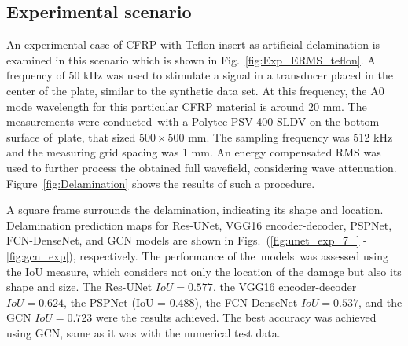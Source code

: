 \subsection{Experimental scenario}
An experimental case of CFRP with Teflon insert as artificial delamination is examined in this scenario which is shown in Fig.~\ref{fig:Exp_ERMS_teflon}. 
A frequency of \(50\) kHz was used to stimulate a signal in a transducer placed in the center of the plate, similar to the synthetic data set.
At this frequency, the A0 mode wavelength for this particular CFRP material is around \(20\) mm.
The measurements were conducted with a Polytec PSV-400 SLDV on the bottom surface of plate, that sized \(500 \times 500\) mm.
The sampling frequency was 512 kHz and the measuring grid spacing was 1 mm.
An energy compensated RMS was used to further process the obtained full wavefield, considering wave attenuation.
Figure~\ref{fig:Delamination} shows the results of such a procedure.

A square frame surrounds the delamination, indicating its shape and location.
Delamination prediction maps for Res-UNet, VGG16 encoder-decoder, PSPNet, FCN-DenseNet, and GCN models are shown in Figs.~(\ref{fig:unet_exp_7_} - \ref{fig:gcn_exp}), respectively.
The performance of the models was assessed using the IoU measure, which considers not only the location of the damage but also its shape and size.
The Res-UNet \(IoU = 0.577\), the VGG16 encoder-decoder \(IoU = 0.624\), the PSPNet (IoU = 0.488), the FCN-DenseNet \(IoU = 0.537\), and the GCN \(IoU = 0.723\) were the results achieved.
The best accuracy was achieved using GCN, same as it was with the numerical test data.

